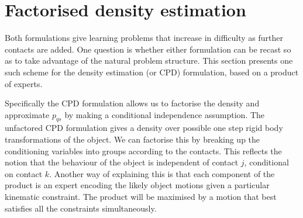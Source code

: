 %
%



\section{Factorised density estimation}
\label{sec:Factors}


Both formulations give learning problems that increase in difficulty as further contacts are added. One question is whether either formulation can be recast so as to take advantage of the natural
problem structure. This section presents one such scheme for the
density estimation (or CPD) formulation, based on a product of experts.

Specifically the CPD formulation allows us to factorise the density
and approximate $p_{qs}$ by making a conditional independence
assumption. The unfactored CPD formulation gives a density over
possible one step rigid body transformations of the object. We can
factorise this by breaking up the conditioning variables into groups
according to the contacts. This reflects the notion that the behaviour
of the object is independent of contact $j$, conditional on contact
$k$. Another way of explaining this is that each component of the
product is an expert encoding the likely object motions given a
particular kinematic constraint. The product will be maximised by a
motion that best satisfies all the constraints simultaneously.

